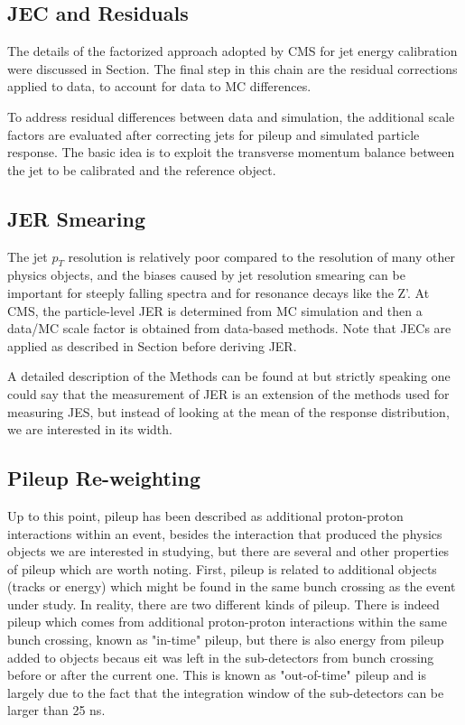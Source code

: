\subsection{JEC and Residuals}
The details of the factorized approach adopted by CMS for jet energy calibration were discussed in Section. The final step in this chain are the residual corrections applied to data, to account for data to MC differences.

To address residual differences between data and simulation, the additional scale factors are evaluated after correcting jets for pileup and simulated particle response. The basic idea is to exploit the transverse momentum balance between the jet to be calibrated and the reference object.

\subsection{JER Smearing}
The jet $p_{T}$ resolution is relatively poor compared to the resolution of many other physics objects, and the biases caused by jet resolution smearing can be important for steeply falling spectra and for resonance decays like the Z'. At CMS, the particle-level JER is determined from MC simulation and then a data/MC scale factor is obtained from data-based methods. Note that JECs are applied as described in Section before deriving JER.

A detailed description of the Methods can be found at \cite{jes_jer} but strictly speaking one could say that the measurement of JER is an extension of the methods used for measuring JES, but instead of looking at the mean of the response distribution, we are interested in its width.

\subsection{Pileup Re-weighting}
Up to this point, pileup has been described as additional proton-proton interactions within an event, besides the interaction that produced the physics objects we are interested in studying, but there are several and other properties of pileup which are worth noting. First, pileup is related to additional objects (tracks or energy) which might be found in the same bunch crossing as the event under study. In reality, there are two different kinds of pileup. There is indeed pileup which comes from additional proton-proton interactions within the same bunch crossing, known as "in-time" pileup, but there is also energy from pileup added to objects becaus eit was left in the sub-detectors from bunch crossing before or after the current one. This is known as "out-of-time" pileup and is largely due to the fact that the integration window of the sub-detectors can be larger than 25 ns. 

